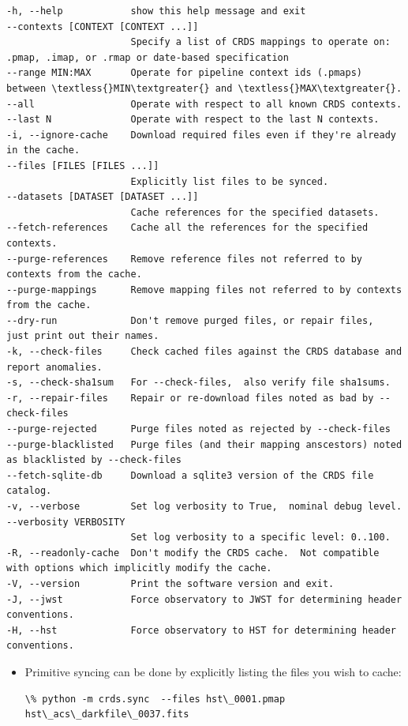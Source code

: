 \documentclass[letterpaper,10pt,english]{sphinxmanual}
\begin{document}
\begin{Verbatim}[commandchars=\\\{\}]
-h, --help            show this help message and exit
--contexts [CONTEXT [CONTEXT ...]]
                      Specify a list of CRDS mappings to operate on: .pmap, .imap, or .rmap or date-based specification
--range MIN:MAX       Operate for pipeline context ids (.pmaps) between \textless{}MIN\textgreater{} and \textless{}MAX\textgreater{}.
--all                 Operate with respect to all known CRDS contexts.
--last N              Operate with respect to the last N contexts.
-i, --ignore-cache    Download required files even if they're already in the cache.
--files [FILES [FILES ...]]
                      Explicitly list files to be synced.
--datasets [DATASET [DATASET ...]]
                      Cache references for the specified datasets.
--fetch-references    Cache all the references for the specified contexts.
--purge-references    Remove reference files not referred to by contexts from the cache.
--purge-mappings      Remove mapping files not referred to by contexts from the cache.
--dry-run             Don't remove purged files, or repair files,  just print out their names.
-k, --check-files     Check cached files against the CRDS database and report anomalies.
-s, --check-sha1sum   For --check-files,  also verify file sha1sums.
-r, --repair-files    Repair or re-download files noted as bad by --check-files
--purge-rejected      Purge files noted as rejected by --check-files
--purge-blacklisted   Purge files (and their mapping anscestors) noted as blacklisted by --check-files
--fetch-sqlite-db     Download a sqlite3 version of the CRDS file catalog.
-v, --verbose         Set log verbosity to True,  nominal debug level.
--verbosity VERBOSITY
                      Set log verbosity to a specific level: 0..100.
-R, --readonly-cache  Don't modify the CRDS cache.  Not compatible with options which implicitly modify the cache.
-V, --version         Print the software version and exit.
-J, --jwst            Force observatory to JWST for determining header conventions.
-H, --hst             Force observatory to HST for determining header conventions.
\end{Verbatim}
\begin{itemize}
\item {} 
Primitive syncing can be done by explicitly listing the files you wish to cache:

\begin{Verbatim}[commandchars=\\\{\}]
\% python -m crds.sync  --files hst\_0001.pmap hst\_acs\_darkfile\_0037.fits
\end{Verbatim}

\end{itemize}
\end{document}
